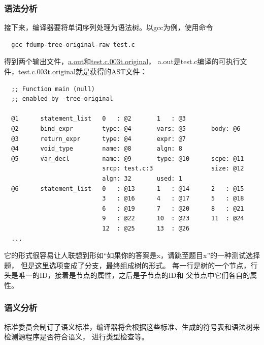 \documentclass[UTF8,a4paper,10pt]{ctexart}
\begin{document}
\subsubsection{语法分析}
接下来，编译器要将单词序列处理为语法树。以gcc为例，使用命令
\begin{lstlisting}
  gcc fdump-tree-original-raw test.c
\end{lstlisting}
得到两个输出文件，\href{run:./test/a.out}{a.out}和\href{run:./test/test.c.003t.original}{test.c.003t.original}，
a.out是test.c编译的可执行文件，test.c.003t.original就是获得的AST文件：
\begin{lstlisting}
  ;; Function main (null)
  ;; enabled by -tree-original
  
  @1      statement_list   0   : @2       1   : @3      
  @2      bind_expr        type: @4       vars: @5       body: @6      
  @3      return_expr      type: @4       expr: @7      
  @4      void_type        name: @8       algn: 8       
  @5      var_decl         name: @9       type: @10      scpe: @11     
                           srcp: test.c:3                size: @12     
                           algn: 32       used: 1       
  @6      statement_list   0   : @13      1   : @14      2   : @15     
                           3   : @16      4   : @17      5   : @18     
                           6   : @19      7   : @20      8   : @21     
                           9   : @22      10  : @23      11  : @24     
                           12  : @25      13  : @26   
  ...  
\end{lstlisting}
它的形式很容易让人联想到形如“如果你的答案是x，请跳至题目x”的一种测试选择题，
但是这里选项变成了分支，最终组成树的形式。
每一行是树的一个节点，行头是唯一的ID，接着是节点的属性，之后是子节点的ID和
父节点中它们各自的属性。

\subsubsection{语义分析}
标准委员会制订了语义标准，编译器将会根据这些标准、生成的符号表和语法树来检测源程序是否符合语义，
进行类型检查等。
\end{document}
